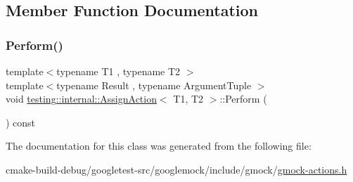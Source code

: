 \subsection{Member Function Documentation}
\mbox{\label{classtesting_1_1internal_1_1AssignAction_a540912bec1f4de6fc4c7de26312e4586}} 
\subsubsection{\texorpdfstring{Perform()}{Perform()}}
{\footnotesize\ttfamily template$<$typename T1 , typename T2 $>$ \\
template$<$typename Result , typename Argument\+Tuple $>$ \\
void \mbox{\hyperlink{classtesting_1_1internal_1_1AssignAction}{testing\+::internal\+::\+Assign\+Action}}$<$ T1, T2 $>$\+::Perform (\begin{DoxyParamCaption}\item[{const Argument\+Tuple \&}]{ }\end{DoxyParamCaption}) const\hspace{0.3cm}{\ttfamily [inline]}}



The documentation for this class was generated from the following file\+:\begin{DoxyCompactItemize}
\item 
cmake-\/build-\/debug/googletest-\/src/googlemock/include/gmock/\mbox{\hyperlink{gmock-actions_8h}{gmock-\/actions.\+h}}\end{DoxyCompactItemize}
